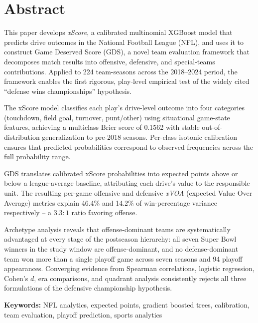 \chapter*{Abstract}

This paper develops \textit{xScore}, a calibrated multinomial XGBoost model that predicts drive outcomes in the National Football League (NFL), and uses it to construct Game Deserved Score (GDS), a novel team evaluation framework that decomposes match results into offensive, defensive, and special-teams contributions. Applied to 224 team-seasons across the 2018--2024 period, the framework enables the first rigorous, play-level empirical test of the widely cited ``defense wins championships'' hypothesis.

The xScore model classifies each play's drive-level outcome into four categories (touchdown, field goal, turnover, punt/other) using situational game-state features, achieving a multiclass Brier score of 0.1562 with stable out-of-distribution generalization to pre-2018 seasons. Per-class isotonic calibration ensures that predicted probabilities correspond to observed frequencies across the full probability range.

GDS translates calibrated xScore probabilities into expected points above or below a league-average baseline, attributing each drive's value to the responsible unit. The resulting per-game offensive and defensive \textit{xVOA} (expected Value Over Average) metrics explain 46.4\% and 14.2\% of win-percentage variance respectively -- a $3.3 : 1$ ratio favoring offense.

Archetype analysis reveals that offense-dominant teams are systematically advantaged at every stage of the postseason hierarchy: all seven Super Bowl winners in the study window are offense-dominant, and no defense-dominant team won more than a single playoff game across seven seasons and 94 playoff appearances. Converging evidence from Spearman correlations, logistic regression, Cohen's $d$, era comparisons, and quadrant analysis consistently rejects all three formulations of the defensive championship hypothesis.

\vspace{1em}
\noindent\textbf{Keywords:} NFL analytics, expected points, gradient boosted trees, calibration, team evaluation, playoff prediction, sports analytics
